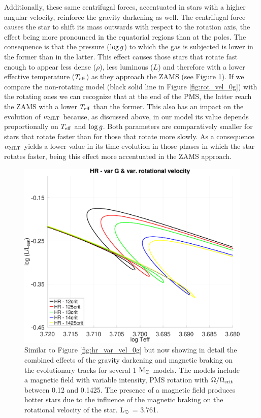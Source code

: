 \documentclass[fleqn,usenatbib]{mnras}
\begin{document}
Additionally, these same centrifugal forces, accentuated in stars with a higher angular velocity, reinforce the gravity darkening \citep[see e.g. ][]{Gossage2021,Paxton2019,Eggenberger2012} as well. The centrifugal force causes the star to shift its mass outwards with respect to the rotation axis, the effect being more pronounced in the equatorial regions than at the poles. The consequence is that the pressure ($\mathrm{log} \, g$) to which the gas is subjected is lower in the former than in the latter. This effect causes those stars that rotate fast enough to appear less dense ($\rho$), less luminous ($L$) and therefore with a lower effective temperature ($T_{\mathrm{eff}}$) as they approach the ZAMS (see Figure \ref{fig:hr_var_vel_var_g_z13}). If we compare the non-rotating model (black solid line in Figure \ref{fig:rot_vel_0g}) with the rotating ones we can recognize that at the end of the PMS, the latter reach the ZAMS with a lower $T_{\mathrm{eff}}$ than the former. This also has an impact on the evolution of $\alpha_{\mathrm{MLT}}$ because, as discussed above, in our model its value depends proportionally on $T_{\mathrm{eff}}$ and $\mathrm{log} \, g$. Both parameters are comparatively smaller for stars that rotate faster than for those that rotate more slowly. As a consequence $\alpha_{\mathrm{MLT}}$ yields a lower value in its time evolution in those phases in which the star rotates faster, being this effect more accentuated in the ZAMS approach.\par

\begin{figure}
	\includegraphics[clip,width=\columnwidth]{figures/paper2/hr_var_vel_var_g_z13.pdf}
    \caption{Similar to Figure \ref{fig:hr_var_vel_0g} but now showing in detail the combined effects of the gravity darkening and magnetic braking on the evolutionary tracks for several 1 $\mathrm{M}_\odot$ models. The models include a magnetic field with variable intensity, PMS rotation with $\Omega / \Omega_{\mathrm{crit}}$ between 0.12 and 0.1425. The presence of a magnetic field produces hotter stars due to the influence of the magnetic braking on the rotational velocity of the star. $\mathrm{L}_\odot$ = 3.761.}
    \label{fig:hr_var_vel_var_g_z13}
\end{figure}
\end{document}
